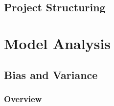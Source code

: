 \subsection{Project Structuring}

\section{Model Analysis}

\subsection{Bias and Variance}
\subsubsection{Overview}
